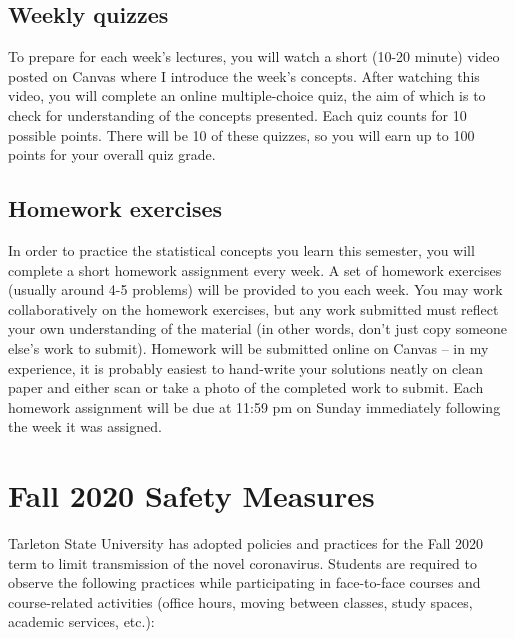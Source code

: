\documentclass[10pt]{article}
\begin{document}
\subsection*{Weekly quizzes}
\label{sec:orge7c95f8}

To prepare for each week's lectures, you will watch a short (10-20 minute) video posted on Canvas where I introduce the week's concepts. After watching this video, you will complete an online multiple-choice quiz, the aim of which is to check for understanding of the concepts presented. Each quiz counts for 10 possible points. There will be 10 of these quizzes, so you will earn up to 100 points for your overall quiz grade.

\subsection*{Homework exercises}
\label{sec:orgc31cc2b}
In order to practice the statistical concepts you learn this semester, you will complete a short homework assignment every week. A set of homework exercises (usually around 4-5 problems) will be provided to you each week. You may work collaboratively on the homework exercises, but any work submitted must reflect your own understanding of the material (in other words, don't just copy someone else's work to submit). Homework will be submitted online on Canvas -- in my experience, it is probably easiest to hand-write your solutions neatly on clean paper and either scan or take a photo of the completed work to submit.  Each homework assignment will be due at 11:59 pm on Sunday immediately following the week it was assigned.

\section*{Fall 2020 Safety Measures}
\label{sec:org9e1f23b}
Tarleton State University has adopted policies and practices for the Fall 2020 term to limit transmission of the novel coronavirus. Students are required to observe the following practices while participating in face-to-face courses and course-related activities (office hours, moving between classes, study spaces, academic services, etc.):
\end{document}
